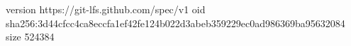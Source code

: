 version https://git-lfs.github.com/spec/v1
oid sha256:3d44cfcc4ca8eccfa1ef42fe124b022d3abeb359229ec0ad986369ba95632084
size 524384
